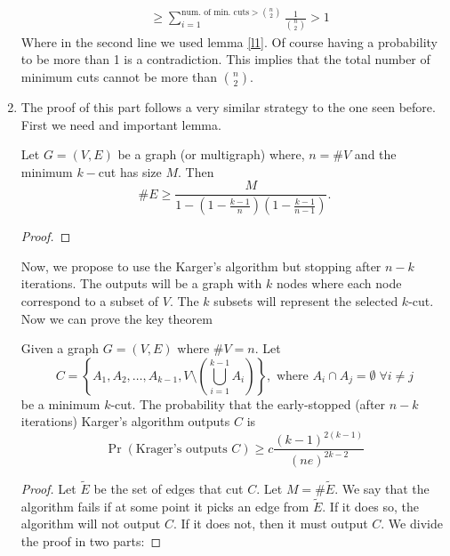 \documentclass[11pt]{article}
\begin{document}
\begin{enumerate}
\begin{align*}
        &\geq  \sum_{i=1}^{\text{num. of min. cuts}>\binom{n}{2}} \frac{1}{\binom{n}{2}} > 1
    \end{align*}
    Where in the second line we used lemma \ref{l1}. Of course having a probability to be more than 1 is a contradiction. This implies that the total number of minimum cuts cannot be more than $\binom{n}{2}$. 
    \item The proof of this part follows a very similar strategy to the one seen before. First we need and important lemma.
    \begin{lemma}\label{l2} Let $G = (V,E)$ be a graph (or multigraph) where, $n = \#V$ and the minimum $k-$cut has size $M$. Then
        \begin{equation*}
            \#E \geq \frac{M}{1-\left(1-\frac{k-1}{n}\right)\left(1-\frac{k-1}{n-1}\right)}.
        \end{equation*}
    \end{lemma}
    \begin{proof}
        
    \end{proof}
    Now, we propose to use the Karger's algorithm but stopping after $n-k$ iterations. The outputs will be a graph with $k$ nodes where each node correspond to a subset of $V$. The $k$ subsets will represent the selected $k$-cut. Now we can prove the key theorem
    \begin{theorem}\label{th1} Given a graph $G=(V,E)$ where $\#V = n$. Let 
    \begin{equation*}
        C = \left\{A_1, A_2,\dots, A_{k-1}, V\setminus\left(\bigcup_{i=1}^{k-1}A_i\right)\right\}, \text{ where } A_i\cap A_j = \emptyset\; \forall i \neq j
    \end{equation*}  
        be a minimum $k$-cut. The probability that the early-stopped (after $n-k$ iterations) Karger's algorithm outputs $C$ is 
        \begin{equation*}
            \Pr\left(\text{Krager's outputs } C\right)\geq c\frac{(k-1)^{2(k-1)}}{(ne)^{2k-2}}
        \end{equation*}
    \end{theorem}
    \begin{proof}
        Let $\tilde E$ be the set of edges that cut $C$. Let $M = \#\tilde E$. We say that the algorithm fails if at some point it picks an edge from $\tilde E$. If it does so, the algorithm will not output $C$. If it does not, then it must output $C$. We divide the proof in two parts:

\end{proof}
\end{enumerate}
\end{document}

